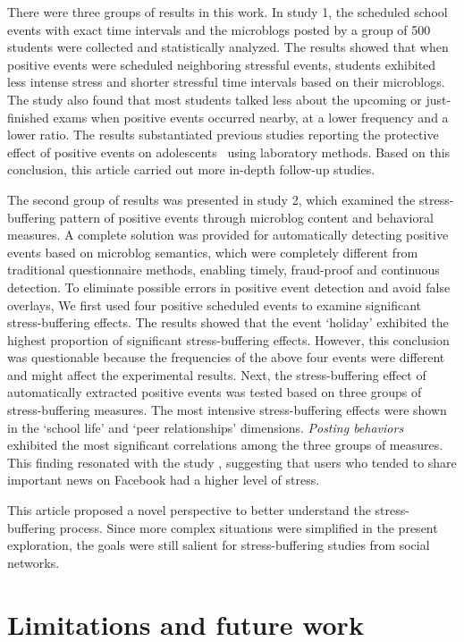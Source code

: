 \documentclass[5p,times,numbers,authoryear]{elsarticle}
\begin{document}
There were three groups of results in this work.
In study 1, the scheduled school events with exact time intervals and the microblogs posted by a group of 500 students were collected and statistically analyzed.
The results showed that when positive events were scheduled neighboring stressful events,
students exhibited less intense stress and shorter stressful time intervals based on their microblogs.
The study also found that most students talked less about the upcoming or just-finished exams when positive events occurred nearby, at a lower frequency and a lower ratio.
The results substantiated previous studies reporting the protective effect of positive events on adolescents~\citep{Cohen2010Positive,Shahar2002Positive} using laboratory methods.
Based on this conclusion, this article carried out more in-depth follow-up studies.

The second group of results was presented in study 2, which
examined the stress-buffering pattern of positive events through microblog content and behavioral measures.
A complete solution was provided for automatically detecting positive events based on microblog semantics, which were completely different from traditional questionnaire methods,
enabling timely, fraud-proof and continuous detection.
To eliminate possible errors in positive event detection and avoid false overlays,
We first used four positive scheduled events to examine significant stress-buffering effects.
The results showed that the event `holiday' exhibited the highest proportion of significant stress-buffering effects.
However, this conclusion was questionable because the frequencies of the above four events were different and might affect the experimental results.
Next, the stress-buffering effect of automatically extracted positive events was tested based on three groups of stress-buffering measures.
The most intensive stress-buffering effects were shown in the `school life' and `peer relationships' dimensions.
\emph{Posting behaviors} exhibited the most significant correlations among the three groups of measures.
This finding resonated with the study \cite{BLACHNIO2016664,Disclosure}, suggesting that users who tended to share important news on Facebook had a higher level of stress.

This article proposed a novel perspective to better understand the stress-buffering process.
Since more complex situations were simplified in the present exploration,
the goals were still salient for stress-buffering studies from social networks.

\section{Limitations and future work}
\end{document}
